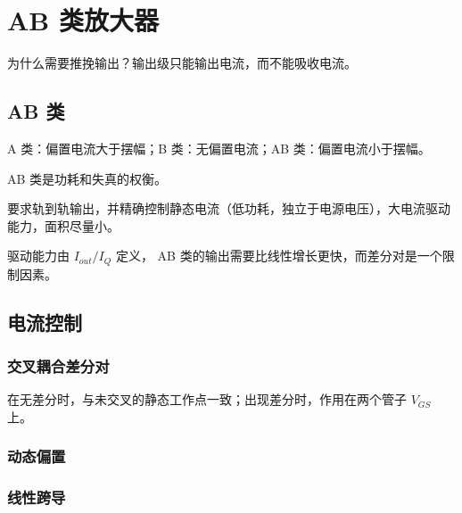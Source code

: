 \documentclass[cn,11pt,chinese,black,simple]{../elegantbook}
\begin{document}
\fi 
\def\chapname{08classAB}

\chapter{AB 类放大器}

为什么需要推挽输出？输出级只能输出电流，而不能吸收电流。

\section{AB 类}

A 类：偏置电流大于摆幅；B 类：无偏置电流；AB 类：偏置电流小于摆幅。

AB 类是功耗和失真的权衡。

要求轨到轨输出，并精确控制静态电流（低功耗，独立于电源电压），大电流驱动能力，面积尽量小。

驱动能力由 \(I_{out}/I_Q\) 定义， AB 类的输出需要比线性增长更快，而差分对是一个限制因素。

\section{电流控制}

\subsection{交叉耦合差分对}

在无差分时，与未交叉的静态工作点一致；出现差分时，作用在两个管子 \(V_{GS}\) 上。

\subsection{动态偏置}

\subsection{线性跨导}







\let\chapname\undefined
\ifx\mainclass\undefined
\end{document}

